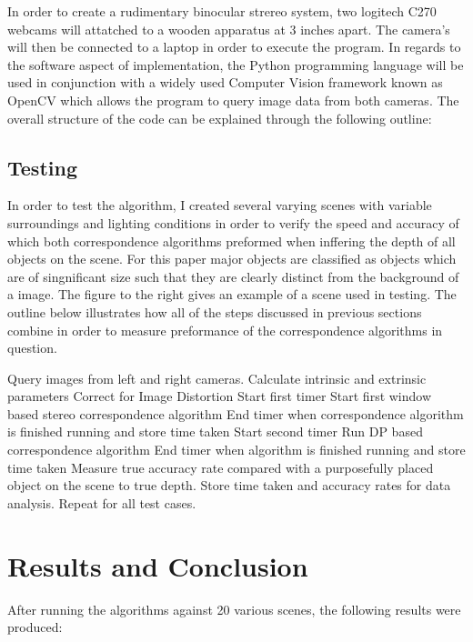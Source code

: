 \documentclass[11pt]{scrartcl}
\begin{document}
In order to create a rudimentary binocular strereo system, two logitech C270 
webcams will attatched to a wooden apparatus at 3 inches apart. The camera's 
will then be connected to a laptop in order to execute the program. In regards 
to the software aspect of implementation, the Python programming language will 
be used in conjunction with a widely used Computer Vision framework known as 
OpenCV which allows the program to query image data from both cameras. The 
overall structure of the code can be explained through the following outline:



\subsection{Testing}
In order to test the algorithm, I created several varying scenes with variable surroundings 
and lighting conditions in order to verify the speed and accuracy of which both correspondence
algorithms preformed when inffering the depth of all objects on the scene. For this paper 
major objects are classified as objects which are of singnificant size such that they are clearly 
distinct from the background of a image. The figure to the right gives an example of a scene used 
in testing. The outline below illustrates how all of the steps discussed in previous sections 
combine in order to measure preformance of the correspondence algorithms in question. 
\begin{outline}[enumerate]
   \1 Query images from left and right cameras.  
    \1 Calculate intrinsic and extrinsic parameters 
   \1 Correct for Image Distortion 
   \1 Start first timer 
   \1 Start first window based stereo correspondence algorithm 
   \1 End timer when correspondence algorithm is finished running and store time taken 
   \1 Start second timer
   \1 Run DP based correspondence algorithm 
   \1 End timer when algorithm is finished running and store time taken
   \1 Measure true accuracy rate compared with a purposefully placed object on the scene 
        to true depth. 
    \1 Store time taken and accuracy rates for data analysis. 
    \1 Repeat for all test cases. 
\end{outline}
\section{Results and Conclusion}

After running the algorithms against 20 various scenes, the following results were 
produced:
\\
\end{document}
